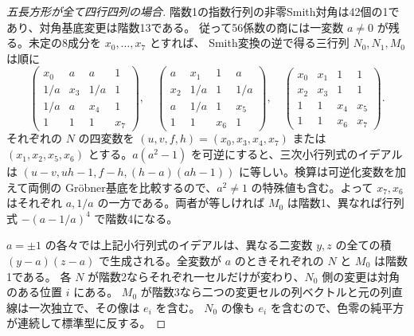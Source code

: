 \begin{proof}[五長方形が全て四行四列の場合]
階数1の指数行列の非零Smith対角は42個の1であり、対角基底変更は階数13である。
従って56係数の商には一変数 $a\ne0$ が残る。未定の8成分を $x_0,\ldots,x_7$ とすれば、
Smith変換の逆で得る三行列 $N_0,N_1,M_0$ は順に
\[
\begin{pmatrix}x_0&a&a&1\\1/a&x_3&1/a&1\\1/a&a&x_4&1\\1&1&1&x_7\end{pmatrix},\quad
\begin{pmatrix}a&x_1&1&a\\x_2&1/a&1&1/a\\a&1/a&1&x_5\\1&1&x_6&1\end{pmatrix},\quad
\begin{pmatrix}x_0&x_1&1&1\\x_2&x_3&1&1\\1&1&x_4&x_5\\1&1&x_6&x_7\end{pmatrix}.
\]
それぞれの $N$ の四変数を $(u,v,f,h)=(x_0,x_3,x_4,x_7)$ または
$(x_1,x_2,x_5,x_6)$ とする。$a(a^2-1)$ を可逆にすると、三次小行列式のイデアルは
$(u-v,uh-1,f-h,(h-a)(ah-1))$ に等しい。検算は可逆化変数を加えて両側の
Gröbner基底を比較するので、$a^2\ne1$ の特殊値も含む。よって $x_7,x_6$ はそれぞれ
$a,1/a$ の一方である。両者が等しければ $M_0$ は階数1、異なれば行列式 $-(a-1/a)^4$ で階数4になる。

$a=\pm1$ の各々では上記小行列式のイデアルは、異なる二変数 $y,z$ の全ての積
$(y-a)(z-a)$ で生成される。全変数が $a$ のときそれぞれの $N$ と $M_0$ は階数1である。
各 $N$ が階数2ならそれぞれ一セルだけが変わり、$N_0$ 側の変更は対角のある位置 $i$ にある。
$M_0$ が階数3なら二つの変更セルの列ベクトルと元の列直線は一次独立で、その像は $e_i$ を含む。
$N_0$ の像も $e_i$ を含むので、色零の純平方が連続して標準型に反する。
\end{proof}

